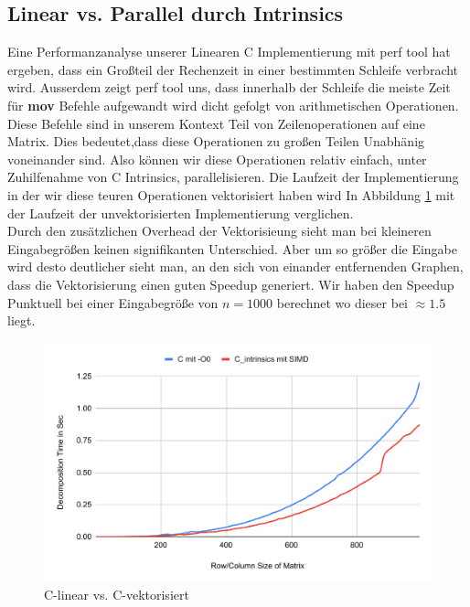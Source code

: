 \documentclass[course=erap]{aspdoc}
\begin{document}
\subsection{Linear vs. Parallel durch Intrinsics}
Eine Performanzanalyse unserer Linearen C Implementierung mit perf tool hat ergeben, dass ein Großteil der Rechenzeit in einer bestimmten Schleife verbracht wird. Ausserdem zeigt perf tool uns, dass innerhalb der
Schleife die meiste Zeit für \textbf{mov} Befehle aufgewandt wird dicht gefolgt von arithmetischen Operationen. Diese Befehle sind in unserem Kontext Teil von Zeilenoperationen auf eine Matrix. Dies bedeutet,dass diese Operationen zu 
großen Teilen Unabhänig voneinander sind. Also können wir diese Operationen relativ einfach, unter Zuhilfenahme von C Intrinsics, parallelisieren.
Die Laufzeit der Implementierung in der wir diese teuren Operationen vektorisiert haben wird In Abbildung \ref{CvsIntrins} mit der Laufzeit der unvektorisierten Implementierung verglichen. \\
Durch den zusätzlichen Overhead der Vektorisieung sieht man bei kleineren Eingabegrößen keinen signifikanten Unterschied. Aber um so größer die Eingabe wird desto deutlicher sieht man, an den sich von einander entfernenden 
Graphen, dass die Vektorisierung einen guten Speedup generiert. 
Wir haben den Speedup Punktuell bei einer Eingabegröße von $n = 1000$ berechnet wo dieser bei $\approx 1.5$  liegt.\\
  \begin{figure}[H]
  \begin{center}
  \caption{C-linear vs. C-vektorisiert}
  \label{CvsIntrins}
  \includegraphics[width = 0.8\linewidth]{CvsIntrins.pdf}
  \end{center}
  \end{figure}
\end{document}
